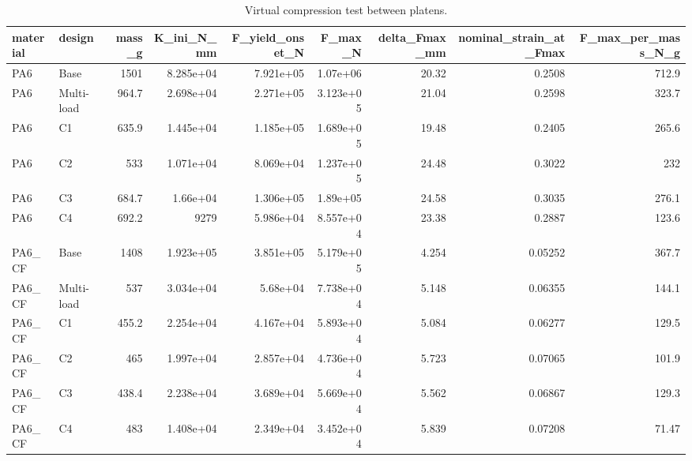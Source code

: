 \begin{table}[htbp]
\centering
\caption{Virtual compression test between platens.}
\label{tab:T10_08_virtual_platen_test}
\begin{tabular}{llrrrrrrr}
\toprule
material & design & mass\_g & K\_ini\_N\_mm & F\_yield\_onset\_N & F\_max\_N & delta\_Fmax\_mm & nominal\_strain\_at\_Fmax & F\_max\_per\_mass\_N\_g \\
\midrule
PA6 & Base & 1501 & 8.285e+04 & 7.921e+05 & 1.07e+06 & 20.32 & 0.2508 & 712.9 \\
PA6 & Multi-load & 964.7 & 2.698e+04 & 2.271e+05 & 3.123e+05 & 21.04 & 0.2598 & 323.7 \\
PA6 & C1 & 635.9 & 1.445e+04 & 1.185e+05 & 1.689e+05 & 19.48 & 0.2405 & 265.6 \\
PA6 & C2 & 533 & 1.071e+04 & 8.069e+04 & 1.237e+05 & 24.48 & 0.3022 & 232 \\
PA6 & C3 & 684.7 & 1.66e+04 & 1.306e+05 & 1.89e+05 & 24.58 & 0.3035 & 276.1 \\
PA6 & C4 & 692.2 & 9279 & 5.986e+04 & 8.557e+04 & 23.38 & 0.2887 & 123.6 \\
PA6\_CF & Base & 1408 & 1.923e+05 & 3.851e+05 & 5.179e+05 & 4.254 & 0.05252 & 367.7 \\
PA6\_CF & Multi-load & 537 & 3.034e+04 & 5.68e+04 & 7.738e+04 & 5.148 & 0.06355 & 144.1 \\
PA6\_CF & C1 & 455.2 & 2.254e+04 & 4.167e+04 & 5.893e+04 & 5.084 & 0.06277 & 129.5 \\
PA6\_CF & C2 & 465 & 1.997e+04 & 2.857e+04 & 4.736e+04 & 5.723 & 0.07065 & 101.9 \\
PA6\_CF & C3 & 438.4 & 2.238e+04 & 3.689e+04 & 5.669e+04 & 5.562 & 0.06867 & 129.3 \\
PA6\_CF & C4 & 483 & 1.408e+04 & 2.349e+04 & 3.452e+04 & 5.839 & 0.07208 & 71.47 \\
\bottomrule
\end{tabular}
\end{table}
